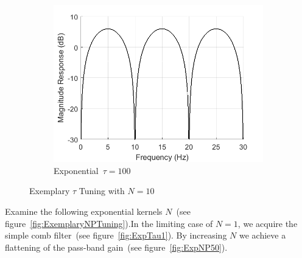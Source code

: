 \documentclass[a4paper]{article}
\newcommand{\figref}[1]{(see figure~\ref{#1})}
\begin{document}
\begin{figure}[hbtp]
\begin{subfigure}{.33\textwidth}
        \includegraphics[width=\textwidth]{img/tau/mag_exp_100.png}
        \caption{Exponential~$\tau=100$}\label{fig:ExpTau100}
    \end{subfigure}
    \caption{Exemplary $\tau$ Tuning with $N=10$}\label{fig:ExemplaryTauTuning}
\end{figure}

Examine the following exponential kernels $N$~\figref{fig:ExemplaryNPTuning}.In the limiting case of $N = 1$, we acquire the simple comb filter~\figref{fig:ExpTau1}. By increasing $N$ we achieve a flattening of the pass-band gain~\figref{fig:ExpNP50}.
\end{document}
